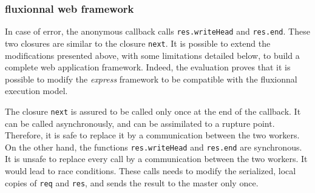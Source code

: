\subsubsection{fluxionnal web framework}

In case of error, the anonymous callback calls \texttt{res.writeHead} and \texttt{res.end}.
These two closures are similar to the closure \texttt{next}.
It is possible to extend the modifications presented above, with some limitations detailed below, to build a complete web application framework.
Indeed, the evaluation proves that it is possible to modify the \textit{express} framework to be compatible with the fluxionnal execution model.

The closure \texttt{next} is assured to be called only once at the end of the callback.
It can be called asynchronously, and can be assimilated to a rupture point.
Therefore, it is safe to replace it by a communication between the two workers.
On the other hand, the functions \texttt{res.writeHead} and \texttt{res.end} are synchronous.
It is unsafe to replace every call by a communication between the two workers.
It would lead to race conditions.
These calls needs to modify the serialized, local copies of \texttt{req} and \texttt{res}, and sends the result to the master only once.